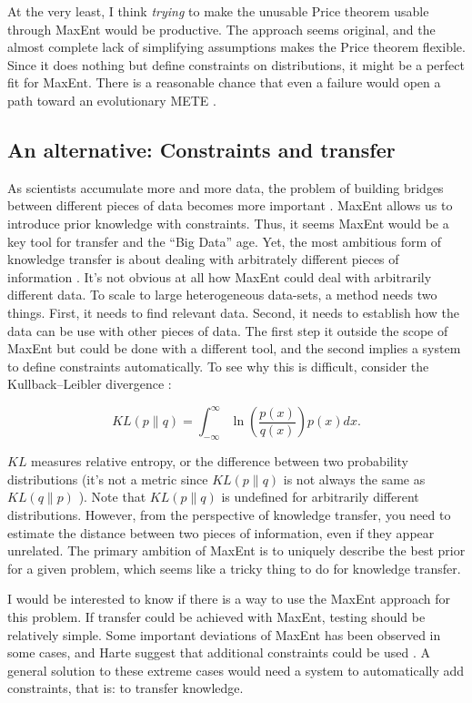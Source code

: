 \documentclass[letterpaper,12pt]{article}
\begin{document}
At the very least, I think \emph{trying} to make the unusable Price theorem
usable through MaxEnt would be productive. The approach seems original, and
the almost complete lack of simplifying assumptions makes the Price theorem
flexible. Since it does nothing but define constraints on distributions, it
might be a perfect fit for MaxEnt. There is a reasonable chance that even a
failure would open a path toward an evolutionary METE \cite{lyn98}.

\subsection{An alternative: Constraints and transfer}

As scientists accumulate more and more data, the problem of building bridges
between different pieces of data becomes more important \cite
{tan06,hal09,rus09}. MaxEnt allows us to introduce prior knowledge with
constraints. Thus, it seems MaxEnt would be a key tool for transfer and the
``Big Data'' age. Yet, the most ambitious form of knowledge transfer is
about dealing with arbitrately different pieces of information \cite
{mil07,dav09,dom09}. It's not obvious at all how MaxEnt could deal with
arbitrarily different data. To scale to large heterogeneous data-sets, a
method needs two things. First, it needs to find relevant data. Second, it
needs to establish how the data can be use with other pieces of data. The
first step it outside the scope of MaxEnt but could be done with a different
tool, and the second implies a system to define constraints automatically.
To see why this is difficult, consider the Kullback–Leibler divergence \cite
{kul51}:

\begin{equation}
 KL(p\|q) = \int_{-\infty}^\infty \ln\left(\frac{p(x)}{q(x)}\right) p(x)dx.
\end{equation}

$KL$ measures relative entropy, or the difference between two probability
distributions (it's not a metric since $KL(p\|q)$ is not always the same as
$KL(q\|p)$ \cite {tho08,tao11}). Note that $KL(p\|q)$ is undefined for
arbitrarily different distributions. However, from the perspective of
knowledge transfer, you need to estimate the distance between two pieces of
information, even if they appear unrelated. The primary ambition of MaxEnt
is to uniquely describe the best prior for a given problem, which seems like
a tricky thing to do for knowledge transfer.

I would be interested to know if there is a way to use the MaxEnt approach
for this problem. If transfer could be achieved with MaxEnt, testing should
be relatively simple. Some important deviations of MaxEnt has been observed
in some cases, and Harte suggest that additional constraints could be used
\cite{har14}. A general solution to these extreme cases would need a system
to automatically add constraints, that is: to transfer knowledge.

\newpage


\end{document}
